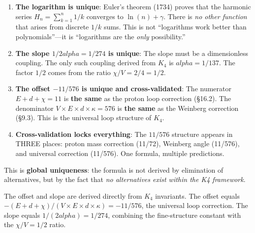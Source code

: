 \documentclass[11pt,a4paper]{book}
\def\alpha{alpha}%
\begin{document}
\begin{enumerate}
\item \textbf{The logarithm is unique}: Euler's theorem (1734) proves that the harmonic series $H_n = \sum_{k=1}^n 1/k$ converges to $\ln(n) + \gamma$. There is \emph{no other function} that arises from discrete $1/k$ sums. This is not ``logarithms work better than polynomials''---it is ``logarithms are the \emph{only} possibility.''

\item \textbf{The slope $1/2\alpha = 1/274$ is unique}: The slope must be a dimensionless coupling. The only such coupling derived from $K_4$ is $\alpha = 1/137$. The factor $1/2$ comes from the ratio $\chi/V = 2/4 = 1/2$.

\item \textbf{The offset $-11/576$ is unique and cross-validated}: The numerator $E + d + \chi = 11$ is \textbf{the same} as the proton loop correction (\S 16.2). The denominator $V \times E \times d \times \kappa = 576$ is \textbf{the same} as the Weinberg correction (\S 9.3). This is the universal loop structure of $K_4$.

\item \textbf{Cross-validation locks everything}: The $11/576$ structure appears in THREE places: proton mass correction (11/72), Weinberg angle (11/576), and universal correction (11/576). One formula, multiple predictions.
\end{enumerate}

This is \textbf{global uniqueness}: the formula is not derived by elimination of alternatives, but by the fact that \emph{no alternatives exist within the K4 framework}.

The offset and slope are derived directly from $K_4$ invariants. The offset equals $-(E + d + \chi)/(V \times E \times d \times \kappa) = -11/576$, the universal loop correction. The slope equals $1/(2\alpha) = 1/274$, combining the fine-structure constant with the $\chi/V = 1/2$ ratio.
\end{document}
